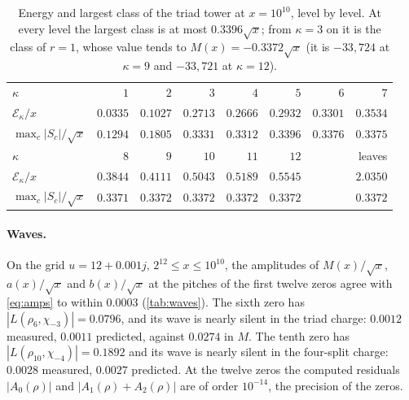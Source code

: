 \documentclass[11pt]{article}
\theoremstyle{definition}\newtheorem{definition}[theorem]{Definition}
\theoremstyle{remark}\newtheorem{remark}[theorem]{Remark}
\theoremstyle{definition}\newtheorem{axiom}{Axiom}
\begin{document}
\begin{table}[!htbp]\centering\small
\begin{tabular}{@{}lrrrrrrr@{}}\toprule
$\kappa$ & $1$ & $2$ & $3$ & $4$ & $5$ & $6$ & $7$\\
$\mathcal E_\kappa/x$ & $0.0335$ & $0.1027$ & $0.2713$ & $0.2666$ & $0.2932$ & $0.3301$ & $0.3534$\\
$\max_c|S_c|/\sqrt x$ & $0.1294$ & $0.1805$ & $0.3331$ & $0.3312$ & $0.3396$ & $0.3376$ & $0.3375$\\\midrule
$\kappa$ & $8$ & $9$ & $10$ & $11$ & $12$ & & leaves\\
$\mathcal E_\kappa/x$ & $0.3844$ & $0.4111$ & $0.5043$ & $0.5189$ & $0.5545$ & & $2.0350$\\
$\max_c|S_c|/\sqrt x$ & $0.3371$ & $0.3372$ & $0.3372$ & $0.3372$ & $0.3372$ & & $0.3372$\\\bottomrule
\end{tabular}
\caption{Energy and largest class of the triad tower at $x=10^{10}$, level by level. At every level the largest class is at most $0.3396\sqrt x$; from $\kappa=3$ on it is the class of $r=1$, whose value tends to $M(x)=-0.3372\sqrt x$ (it is $-33{,}724$ at $\kappa=9$ and $-33{,}721$ at $\kappa=12$).}\label{tab:levels}
\end{table}

\paragraph{Waves.} On the grid $u=12+0.001j$, $2^{12}\le x\le10^{10}$, the amplitudes of $M(x)/\sqrt x$, $a(x)/\sqrt x$ and $b(x)/\sqrt x$ at the pitches of the first twelve zeros agree with \eqref{eq:amps} to within $0.0003$ (\cref{tab:waves}). The sixth zero has $|L(\rho_6,\chi_{-3})|=0.0796$, and its wave is nearly silent in the triad charge: $0.0012$ measured, $0.0011$ predicted, against $0.0274$ in $M$. The tenth zero has $|L(\rho_{10},\chi_{-4})|=0.1892$ and its wave is nearly silent in the four-split charge: $0.0028$ measured, $0.0027$ predicted. At the twelve zeros the computed residuals $|A_0(\rho)|$ and $|A_1(\rho)+A_2(\rho)|$ are of order $10^{-14}$, the precision of the zeros.
\end{document}
